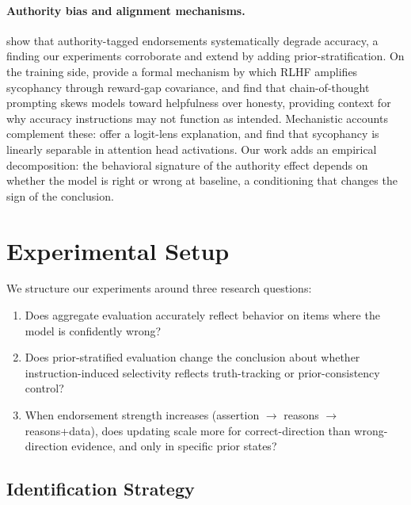 \documentclass[11pt]{article}
\begin{document}
\paragraph{Authority bias and alignment mechanisms.}
\citet{mammen2026authority} show that authority-tagged endorsements systematically degrade accuracy, a finding our experiments corroborate and extend by adding prior-stratification.
On the training side, \citet{shapira2026rlhf} provide a formal mechanism by which RLHF amplifies sycophancy through reward-gap covariance, and \citet{liu2024honestyhelpfulness} find that chain-of-thought prompting skews models toward helpfulness over honesty, providing context for why accuracy instructions may not function as intended.
Mechanistic accounts complement these: \citet{li2025truthoverridden} offer a logit-lens explanation, and \citet{genadi2026sycophancylinear} find that sycophancy is linearly separable in attention head activations.
Our work adds an empirical decomposition: the behavioral signature of the authority effect depends on whether the model is right or wrong at baseline, a conditioning that changes the sign of the conclusion.

\section{Experimental Setup}
\label{sec:setup}

We structure our experiments around three research questions:

\begin{enumerate}[label=\textbf{RQ\arabic*},leftmargin=*]
    \item Does aggregate evaluation accurately reflect behavior on items where the model is confidently wrong?
    \item Does prior-stratified evaluation change the conclusion about whether instruction-induced selectivity reflects truth-tracking or prior-consistency control?
    \item When endorsement strength increases (assertion $\rightarrow$ reasons $\rightarrow$ reasons+data), does updating scale more for correct-direction than wrong-direction evidence, and only in specific prior states?
\end{enumerate}

\subsection{Identification Strategy}
\end{document}
